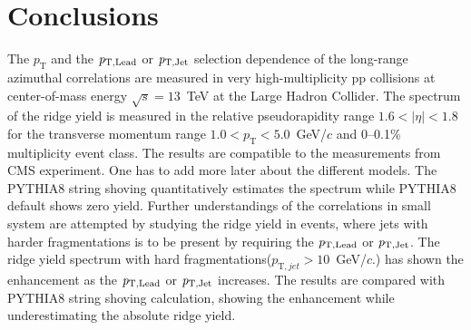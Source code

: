 
\section{Conclusions}
\label{sec:summary}


The $p_{\mathrm T}$ and the $\it{p}_{\rm{T,Lead}}$ or $\it{p}_{\rm{T,Jet}}$ selection dependence of the long-range azimuthal correlations are measured in very high-multiplicity pp collisions at center-of-mass energy $\sqrt{s} = 13$~TeV at the Large Hadron Collider. The spectrum of the ridge yield is measured in the relative pseudorapidity range $1.6 < |\eta| < 1.8$ for the transverse momentum range $1.0 < p_{\mathrm T} < 5.0$~GeV/$c$ and 0--0.1\% multiplicity event class. The results are compatible to the measurements from CMS experiment. One has to add more later about the different models.
The PYTHIA8 string shoving quantitatively estimates the spectrum while PYTHIA8 default shows zero yield. Further understandings of the correlations in small system are attempted by studying the ridge yield in events, where jets with harder fragmentations is to be present by requiring the $\it{p}_{\rm{T,Lead}}$ or $\it{p}_{\rm{T,Jet}}$. The ridge yield spectrum with hard fragmentations($p_{\mathrm T, jet} > 10$~GeV/$c$.) has shown the enhancement as the $\it{p}_{\rm{T,Lead}}$ or $\it{p}_{\rm{T,Jet}}$ increases. The results are compared with PYTHIA8 string shoving calculation, showing the enhancement while underestimating the absolute ridge yield.